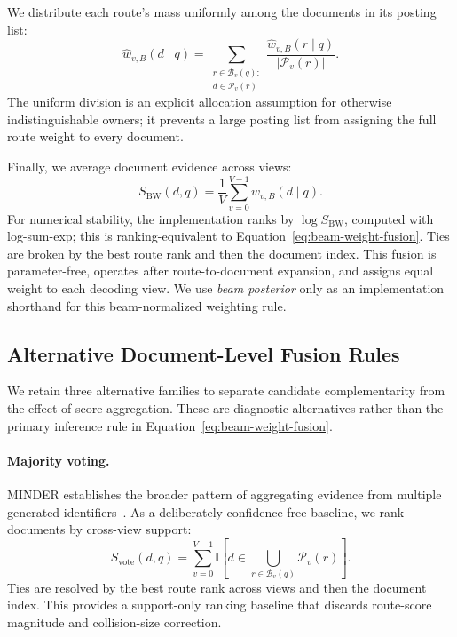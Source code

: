 We distribute each route's mass uniformly among the documents in its posting list:
\begin{equation}
\label{eq:view-doc-weight}
    \widehat{w}_{v,B}(d\mid q)
    =
    \sum_{\substack{r\in\mathcal{B}_v(q):\\d\in\mathcal{P}_v(r)}}
    \frac{\widehat{w}_{v,B}(r\mid q)}
         {|\mathcal{P}_v(r)|}.
\end{equation}
The uniform division is an explicit allocation assumption for otherwise indistinguishable owners; it prevents a large posting list from assigning the full route weight to every document.

Finally, we average document evidence across views:
\begin{equation}
\label{eq:beam-weight-fusion}
    S_{\mathrm{BW}}(d,q)
    =\frac{1}{V}\sum_{v=0}^{V-1}
      \widehat{w}_{v,B}(d\mid q).
\end{equation}
For numerical stability, the implementation ranks by $\log S_{\mathrm{BW}}$, computed with log-sum-exp; this is ranking-equivalent to Equation~\ref{eq:beam-weight-fusion}. Ties are broken by the best route rank and then the document index. This fusion is parameter-free, operates after route-to-document expansion, and assigns equal weight to each decoding view. We use \emph{beam posterior} only as an implementation shorthand for this beam-normalized weighting rule.

\subsection{Alternative Document-Level Fusion Rules}
\label{sec:fusion-ablations}

We retain three alternative families to separate candidate complementarity from the effect of score aggregation. These are diagnostic alternatives rather than the primary inference rule in Equation~\ref{eq:beam-weight-fusion}.

\paragraph{Majority voting.}
MINDER establishes the broader pattern of aggregating evidence from multiple generated identifiers~\citep{li2023minder}. As a deliberately confidence-free baseline, we rank documents by cross-view support:
\begin{equation}
    S_{\mathrm{vote}}(d,q)
    =\sum_{v=0}^{V-1}
      \mathbb{I}\!\left[
        d\in\bigcup_{r\in\mathcal{B}_v(q)}\mathcal{P}_v(r)
      \right].
\end{equation}
Ties are resolved by the best route rank across views and then the document index. This provides a support-only ranking baseline that discards route-score magnitude and collision-size correction.

